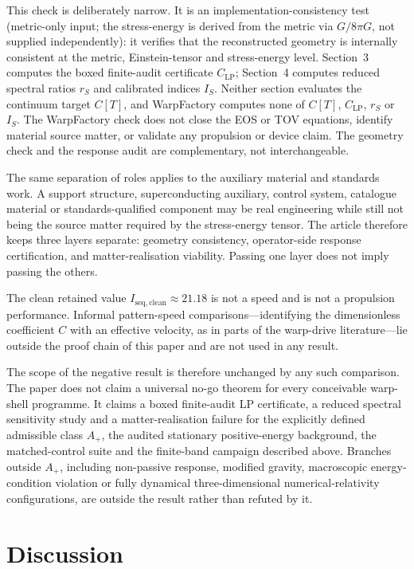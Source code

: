 \documentclass[11pt,a4paper]{article}
\begin{document}
This check is deliberately narrow. It is an implementation-consistency test (metric-only input; the stress-energy is derived from the metric via $G/8\pi G$, not supplied independently): it verifies that the reconstructed geometry is internally consistent at the metric, Einstein-tensor and stress-energy level. Section~3 computes the boxed finite-audit certificate $C_{\mathrm{LP}}$; Section~4 computes reduced spectral ratios $r_{S}$ and calibrated indices $I_{S}$. Neither section evaluates the continuum target $C[T]$, and WarpFactory computes none of $C[T]$, $C_{\mathrm{LP}}$, $r_{S}$ or $I_{S}$. The WarpFactory check does not close the EOS or TOV equations, identify material source matter, or validate any propulsion or device claim. The geometry check and the response audit are complementary, not interchangeable.

The same separation of roles applies to the auxiliary material and standards work. A support structure, superconducting auxiliary, control system, catalogue material or standards-qualified component may be real engineering while still not being the source matter required by the stress-energy tensor. The article therefore keeps three layers separate: geometry consistency, operator-side response certification, and matter-realisation viability. Passing one layer does not imply passing the others.

The clean retained value $I_{\mathrm{seq,clean}}\approx21.18$ is not a speed and is not a propulsion performance. Informal pattern-speed comparisons---identifying the dimensionless coefficient $C$ with an effective velocity, as in parts of the warp-drive literature---lie outside the proof chain of this paper and are not used in any result.

The scope of the negative result is therefore unchanged by any such comparison. The paper does not claim a universal no-go theorem for every conceivable warp-shell programme. It claims a boxed finite-audit LP certificate, a reduced spectral sensitivity study and a matter-realisation failure for the explicitly defined admissible class $A_{+}$, the audited stationary positive-energy background, the matched-control suite and the finite-band campaign described above. Branches outside $A_{+}$, including non-passive response, modified gravity, macroscopic energy-condition violation or fully dynamical three-dimensional numerical-relativity configurations, are outside the result rather than refuted by it.

\section{Discussion}\label{sec:discussion}
\end{document}
